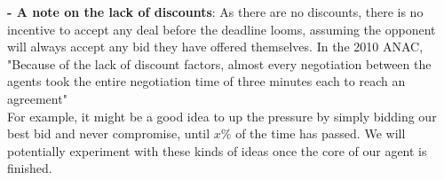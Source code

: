 \documentclass{article}
\begin{document}
\begin{enumerate}[label=(\alph*)]
\textbf{- A note on the lack of discounts}: As there are no discounts, there is no incentive to accept any deal before the deadline looms, assuming the opponent will always accept any bid they have offered themselves. In the 2010 ANAC, "Because of the lack of discount factors, almost every negotiation between the agents took the entire negotiation time of three minutes each to reach an agreement"\cite{Baarslag2012}\\
For example, it might be a good idea to up the pressure by simply bidding our best bid and never compromise, until $x\%$ of the time has passed. We will potentially experiment with these kinds of ideas once the core of our agent is finished.
\end{enumerate} 





\end{document}
